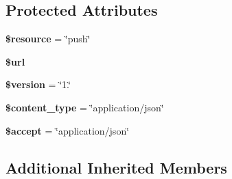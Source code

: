 \subsection*{Protected Attributes}
\begin{DoxyCompactItemize}
\item 
\hypertarget{class_push_notification_service_abd4c7b8b084214b8d2533ba07fce6b83}{{\bfseries \$resource} = \char`\"{}push\char`\"{}}\label{class_push_notification_service_abd4c7b8b084214b8d2533ba07fce6b83}

\item 
\hypertarget{class_push_notification_service_acf215f34a917d014776ce684a9ee8909}{{\bfseries \$url}}\label{class_push_notification_service_acf215f34a917d014776ce684a9ee8909}

\item 
\hypertarget{class_push_notification_service_a17c8948c68aa44fa9961ae169b6a8961}{{\bfseries \$version} = \char`\"{}1.\char`\"{}}\label{class_push_notification_service_a17c8948c68aa44fa9961ae169b6a8961}

\item 
\hypertarget{class_push_notification_service_ae754d6373f275e781f47c8bc9b994b6d}{{\bfseries \$content\+\_\+type} = \char`\"{}application/json\char`\"{}}\label{class_push_notification_service_ae754d6373f275e781f47c8bc9b994b6d}

\item 
\hypertarget{class_push_notification_service_a75fc18c4ff06288ff9fdf8aba9bd1081}{{\bfseries \$accept} = \char`\"{}application/json\char`\"{}}\label{class_push_notification_service_a75fc18c4ff06288ff9fdf8aba9bd1081}

\end{DoxyCompactItemize}
\subsection*{Additional Inherited Members}


